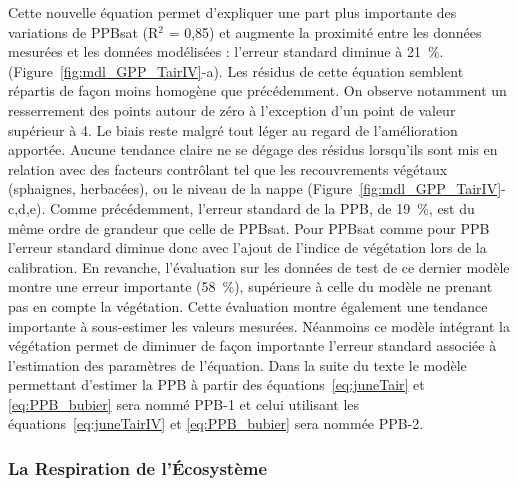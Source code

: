 Cette nouvelle équation permet d'expliquer une part plus importante des variations de PPBsat (R$^{2}$ = 0,85) et augmente la proximité entre les données mesurées et les données modélisées : l'erreur standard diminue à \SI{21}{\percent}. (Figure~\ref{fig:mdl_GPP_TairIV}-a).
Les résidus de cette équation semblent répartis de façon moins homogène que précédemment.
On observe notamment un resserrement des points autour de zéro à l'exception d'un point de valeur supérieur à \num{4}.
Le biais reste malgré tout léger au regard de l'amélioration apportée.
Aucune tendance claire ne se dégage des résidus lorsqu'ils sont mis en relation avec des facteurs contrôlant tel que les recouvrements végétaux (sphaignes, herbacées), ou le niveau de la nappe (Figure~\ref{fig:mdl_GPP_TairIV}-c,d,e).
Comme précédemment, l'erreur standard de la PPB, de \SI{19}{\percent}, est du même ordre de grandeur que celle de PPBsat.
Pour PPBsat comme pour PPB l'erreur standard diminue donc avec l'ajout de l'indice de végétation lors de la calibration.
En revanche, l'évaluation sur les données de test de ce dernier modèle montre une erreur importante (\SI{58}{\percent}), supérieure à celle du modèle ne prenant pas en compte la végétation.
Cette évaluation montre également une tendance importante à sous-estimer les valeurs mesurées.
Néanmoins ce modèle intégrant la végétation permet de diminuer de façon importante l'erreur standard associée à l'estimation des paramètres de l'équation.
Dans la suite du texte le modèle permettant d'estimer la PPB à partir des équations~\ref{eq:juneTair} et \ref{eq:PPB_bubier} sera nommé PPB-1 et celui utilisant les équations~\ref{eq:juneTairIV} et \ref{eq:PPB_bubier} sera nommée PPB-2.




\subsubsection{La Respiration de l'Écosystème}

